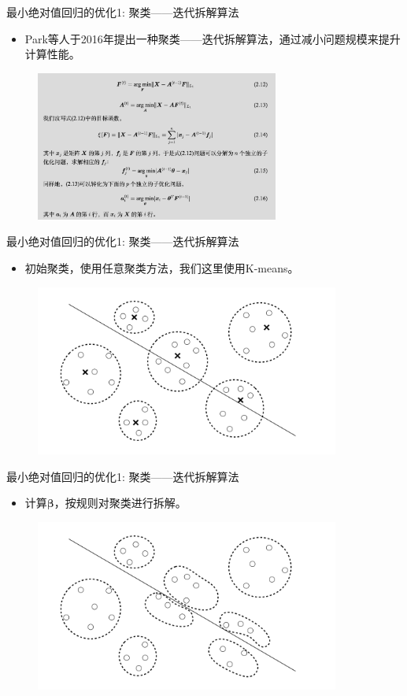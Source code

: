 \begin{frame}{最小绝对值回归的优化1: 聚类——迭代拆解算法}
    \begin{itemize}
        \item
        Park等人于2016年提出一种聚类——迭代拆解算法，通过减小问题规模来提升计算性能。
    \end{itemize}
\begin{figure}[H]
\includegraphics[width=8cm]{pics/acp-problem.png}
\end{figure}

\end{frame}
\begin{frame}{最小绝对值回归的优化1: 聚类——迭代拆解算法}
    \begin{itemize}
        \item 初始聚类，使用任意聚类方法，我们这里使用K-means。
    \end{itemize}
\begin{figure}[H]
\includegraphics[width=10cm]{pics/aid-demo-a.pdf}
\end{figure}
\end{frame}

\begin{frame}{最小绝对值回归的优化1: 聚类——迭代拆解算法}
    \begin{itemize}
        \item 计算$\bm \beta$，按规则对聚类进行拆解。
    \end{itemize}
\begin{figure}[H]
\includegraphics[width=10cm]{pics/aid-demo-b.pdf}
\end{figure}
\end{frame}

